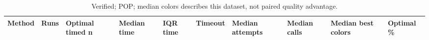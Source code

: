 \begin{table}[htbp]
\centering
\caption{Verified; POP; median colors describes this dataset, not paired quality advantage.}
\label{tab:p2a-POP-methods}
\begin{tabular}{llllllllll}
\hline
Method & Runs & Optimal timed n & Median time & IQR time & Timeout & Median attempts & Median calls & Median best colors & Optimal \% \\
\hline
\hline
\end{tabular}
\end{table}
